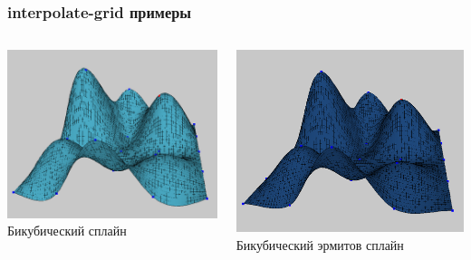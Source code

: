 \documentclass[rpussian]{beamer}
\begin{document}
\begin{frame}
  \frametitle{interpolate-grid примеры}
    \begin{columns}[c]
    \begin{column}{.5\textwidth}
      \begin{center}
        \includegraphics[width=\textwidth,keepaspectratio]{small_bicubic}
        \newline
        \scriptsize Бикубический сплайн
      \end{center}
    \end{column}
    \begin{column}{.5\textwidth}
      \begin{center}
      \includegraphics[width=\textwidth,keepaspectratio]{small_bicubic_hermite}
      \newline
      \scriptsize Бикубический эрмитов сплайн
      \end{center}
    \end{column}
  \end{columns}
\end{frame}
\end{document}
